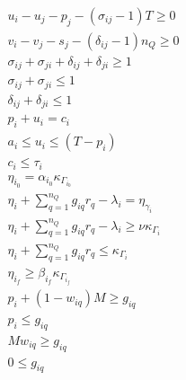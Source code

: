 \begin{subequations}
\label{eq:dynconstrs}
\begin{align}
    u_i - u_j - p_j - (\sigma_{ij} - 1)T \geq 0                             \label{subeq:m_time}         \\
    v_i - v_j - s_j - (\delta_{ij} - 1)n_Q \geq 0                             \label{subeq:m_space}        \\
    \sigma_{ij} + \sigma_{ji} + \delta_{ij} + \delta_{ji} \geq 1            \label{subeq:m_valid_pos}    \\
    \sigma_{ij} + \sigma_{ji} \leq 1                                        \label{subeq:m_sigma}        \\
    \delta_{ij} + \delta_{ji} \leq 1                                        \label{subeq:m_delta}        \\
    p_i + u_i = c_i                                                         \label{subeq:m_detach}       \\
    a_i \leq u_i \leq (T - p_i)                                             \label{subeq:m_valid_starts} \\
    c_i \leq \tau_i                                                         \label{subeq:m_valid_depart} \\
    \eta_{i_0} = \alpha_{i_0} \kappa_{\Gamma_{i_0}}                         \label{subeq:init_charge}    \\
    \eta_i + \sum_{q=1}^{n_Q} g_{iq} r_q - \lambda_i = \eta_{\gamma_i}          \label{subeq:next_charge}    \\
    \eta_i + \sum_{q=1}^{n_Q} g_{iq} r_q - \lambda_i \geq \nu \kappa_{\Gamma_i} \label{subeq:min_charge}     \\
    \eta_i + \sum_{q=1}^{n_Q} g_{iq} r_q \leq \kappa_{\Gamma_i}                 \label{subeq:max_charge}     \\
    \eta_{i_f} \geq \beta_{i_f} \kappa_{\Gamma_{i_f}}                       \label{subeq:final_charge}   \\
    p_i + (1 - w_{iq})M \geq g_{iq}                                         \label{subeq:gpgret}         \\
    p_i \leq g_{iq}                                                         \label{subeq:gples}          \\
    Mw_{iq} \geq g_{iq}                                                     \label{subeq:gwgret}         \\
    0 \leq g_{iq}                                                           \label{subeq:gwles}          \\

\end{align}
\end{subequations}
